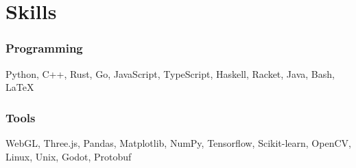 \section{Skills}

\begin{resumeItem}

\subsubsection{Programming}
Python, C++, Rust, Go, JavaScript, TypeScript, Haskell, Racket, Java, Bash, {\LaTeX}

\subsubsection{Tools}
WebGL, Three.js, Pandas, Matplotlib, NumPy, Tensorflow, Scikit-learn, OpenCV, Linux, Unix, Godot, Protobuf
\end{resumeItem}

